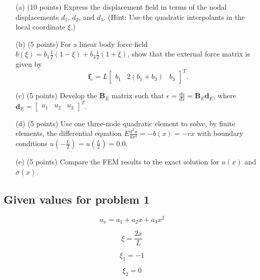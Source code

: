 \documentclass{article}
\begin{document}
\begin{enumerate}
    \item[(a)] (10 points) Express the displacement field in terms of the nodal displacements \( d_1 \), \( d_2 \), and \( d_3 \). (Hint: Use the quadratic interpolants in the local coordinate \( \xi \).)
    
    \item[(b)] (5 points) For a linear body force field \( b(\xi) = b_1 \frac{1}{2}(1 - \xi) + b_3 \frac{1}{2}(1 + \xi) \), show that the external force matrix is given by 
    \[
    \mathbf{f}_e = L \begin{bmatrix} b_1 & 2(b_1 + b_3) & b_3 \end{bmatrix}^T.
    \]
    
    \item[(c)] (5 points) Develop the \( \mathbf{B}_E \) matrix such that \( \epsilon = \frac{du}{dx} = \mathbf{B}_E \mathbf{d}_E \), where \( \mathbf{d}_E = \begin{bmatrix} u_1 & u_2 & u_3 \end{bmatrix}^T \).
    
    \item[(d)] (5 points) Use one three-node quadratic element to solve, by finite elements, the differential equation \( E \frac{d^2 u}{dx^2} = -b(x) = -c x \) with boundary conditions \( u\left(-\frac{L}{2}\right) = u\left(\frac{L}{2}\right) = 0.0 \).
    
    \item[(e)] (5 points) Compare the FEM results to the exact solution for \( u(x) \) and \( \sigma(x) \).
\end{enumerate}

\subsection*{Given values for problem 1}

\begin{equation}
    u_{x} = a_{1} + a_{2}x + a_{3}x^{2}
    \label{eq:u(x)}
\end{equation}

\begin{equation}
    \xi = \frac{2x}{L}
    \label{eq:xi}
\end{equation}

\begin{equation}
    \xi_{1} = -1
    \label{eq:xi_1}
\end{equation}

\begin{equation}
    \xi_{2} = 0
    \label{eq:xi_2}
\end{equation}
\end{document}
